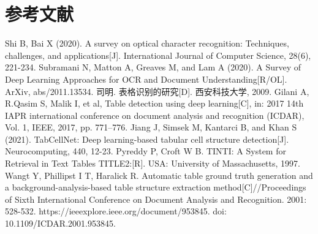 \documentclass[UTF8,12pt, AutoFakeBold,fontset = founder]{ctexart}
\begin{document}
\section{参考文献}
\renewcommand{\section}[2]{} 
\begingroup
\fontsize{10.5pt}{12pt}\selectfont  %
\renewcommand{\baselinestretch}{1.0}  %
\setlength{\bibsep}{0pt} %
\begin{thebibliography}{00}
     Shi B, Bai X (2020). A survey on optical character recognition: Techniques, challenges, and applications[J]. International Journal of Computer Science, 28(6), 221-234. 
     Subramani N, Matton A, Greaves M, and Lam A (2020). A Survey of Deep Learning Approaches for OCR and Document Understanding[R/OL]. ArXiv, abs/2011.13534.
    司明. 表格识别的研究[D]. 西安科技大学, 2009.
     Gilani A, R.Qasim S, Malik I, et al, Table detection using deep learning[C], in: 2017 14th IAPR international conference on document analysis and recognition (ICDAR), Vol. 1, IEEE, 2017, pp. 771–776.
     Jiang J, Simsek M, Kantarci B, and Khan S (2021). TabCellNet: Deep learning-based tabular cell structure detection[J]. Neurocomputing, 440, 12-23.
     Pyreddy P, Croft W B. TINTI: A System for Retrieval in Text Tables TITLE2:[R]. USA: University of Massachusetts, 1997.
     Wangt Y, Phillipst I T, Haralick R. Automatic table ground truth generation and a background-analysis-based table structure extraction method[C]//Proceedings of Sixth International Conference on Document Analysis and Recognition. 2001: 528-532. https://ieeexplore.ieee.org/document/953845. doi: 10.1109/ICDAR.2001.953845.


\end{thebibliography}
\end{document}
